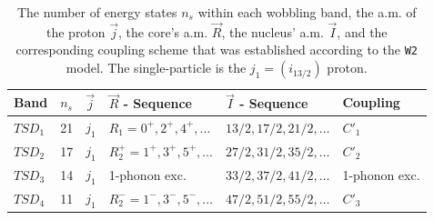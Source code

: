 \documentclass[myclassdoc,debug]{rjparticle}
\begin{document}
\begin{table}
\caption{The number of energy states $n_s$ within each wobbling band, the a.m. of the proton $\vec{j}$, the core's a.m. $\vec{R}$, the nucleus' a.m. $\vec{I}$, and the corresponding coupling scheme that was established according to the \texttt{W2} model. The single-particle is the $j_1=(i_{13/2})$ proton.}
    \centering
  \begin{tabular}{llllll}
  \hline
  Band & $n_s$ & $\vec{j}$ & $\vec{R}$ - Sequence & $\vec{I}$ - Sequence & Coupling  \\
  \hline
  \hline
     $TSD_1$ &       21      &   $j_1$  &        $R_1=0^+,2^+,4^+,\dots$         &   $13/2,17/2,21/2,\dots$    & $C'_1$     \\
     $TSD_2$ &        17     &   $j_1$   &       $R_2^+=1^+,3^+,5^+,\dots$             &      $27/2,31/2,35/2,\dots$                &      $C'_2$           \\
     $TSD_3$ &      14       &    $j_1$  &           1-phonon exc.         & $33/2,37/2,41/2,\dots$                &       1-phonon exc.           \\
     $TSD_4$ &       11      &   $j_1$   &    $R_2^-=1^-,3^-,5^-,\dots$                &               $47/2,51/2,55/2,\dots$         &      $C'_3$          \\
     \hline
\end{tabular}
    \label{4-band-information}
\end{table}
\end{document}
